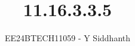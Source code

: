 \documentclass[journal]{IEEEtran}
\begin{document}
	
	
	\vspace{3cm}
	
	\title{11.16.3.3.5}
	\author{EE24BTECH11059 - Y Siddhanth}
	{\let\newpage\relax\maketitle}
	
	\renewcommand{\thefigure}{\theenumi}
	\renewcommand{\thetable}{\theenumi}
	\setlength{\intextsep}{10pt} %
	
	
	\renewcommand{\thetable}{\theenumi}
	
\end{document}
